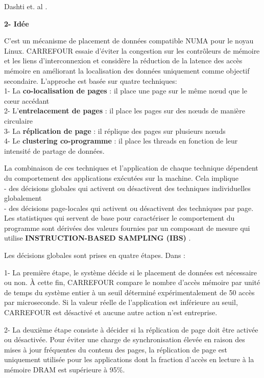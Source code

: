 Dashti et. al \cite{Das44}.

\textbf{2- Idée}

C'est un mécanisme de placement de données compatible NUMA pour le noyau Linux.  
CARREFOUR essaie d'éviter la congestion sur les contrôleurs de mémoire et les liens d'interconnexion et 
considère la réduction de la latence des accès mémoire en améliorant la localisation des données uniquement comme objectif secondaire. 
L'approche est basée sur quatre techniques: \\
1- La \textbf{co-localisation de pages} : il place une page sur le même nœud que le cœur accédant\\
2- L'\textbf{entrelacement de pages} : il place les pages sur des nœuds de manière circulaire\\
3- La \textbf{réplication de page} : il réplique des pages sur plusieurs nœuds\\
4- Le \textbf{clustering co-programme} : il place les threads en fonction de leur intensité de partage de données. 

La combinaison de ces techniques et l'application de chaque technique dépendent du comportement des applications exécutées sur la machine. 
Cela implique \\
- des décisions globales qui activent ou désactivent des techniques individuelles globalement\\
- des décisions page-locales qui activent ou désactivent des techniques par page. \\
Les statistiques qui servent de base pour caractériser le comportement du programme sont dérivées des valeurs fournies par un composant de mesure qui utilise \textbf{INSTRUCTION-BASED SAMPLING (IBS)} \cite{IBS48}.

Les décisions globales sont prises en quatre étapes. Dans :

1- La première étape, le système décide si le placement de données est nécessaire ou non. 
À cette fin, CARREFOUR compare le nombre d'accès mémoire par unité de temps du système entier à un seuil déterminé expérimentalement de 50 accès par microseconde. 
Si la valeur réelle de l'application est inférieure au seuil, CARREFOUR est désactivé et aucune autre action n'est entreprise. 

2- La deuxième étape consiste à décider si la réplication de page doit être activée ou désactivée. 
Pour éviter une charge de synchronisation élevée en raison des mises à jour fréquentes du contenu des pages, la réplication de page est uniquement utilisée pour les applications dont la fraction d'accès en lecture à la mémoire DRAM est supérieure à 95\%. 

